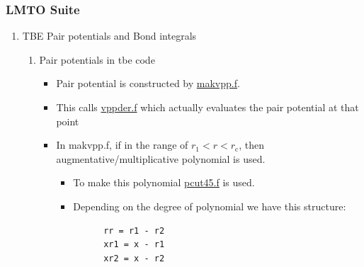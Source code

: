 \documentclass[11pt]{article}
\begin{document}
\subsubsection{LMTO Suite}
\label{sec:org229dd71}
\begin{enumerate}
\item TBE Pair potentials and Bond integrals
\label{sec:orgf59cd21}
\begin{enumerate}
\item Pair potentials in tbe code
\label{sec:orga691250}
\begin{itemize}
\item Pair potential is constructed by \href{file:///home/tigany/lm/tb/makvpp.f}{makvpp.f}.
\item This calls \href{file:///home/tigany/lm/tb/vppder.f}{vppder.f} which actually evaluates the pair potential at that
point
\item In makvpp.f, if in the range of \(r_1 < r < r_{\text{c}}\), then
augmentative/multiplicative polynomial is used.
\begin{itemize}
\item To make this polynomial \href{file:///home/tigany/lm/tb/pcut45.f}{pcut45.f} is used.
\item Depending on the degree of polynomial we have this structure:
\begin{verbatim}
      rr = r1 - r2
      xr1 = x - r1
      xr2 = x - r2


\end{verbatim}
\end{itemize}
\end{itemize}
\end{enumerate}
\end{enumerate}
\end{document}
